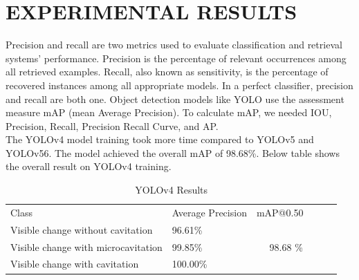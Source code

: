 \chapter{EXPERIMENTAL RESULTS}
Precision and recall are two metrics used to evaluate classification and retrieval systems' performance. Precision is the percentage of relevant occurrences among all retrieved examples. Recall, also known as sensitivity, is the percentage of recovered instances among all appropriate models. In a perfect classifier, precision and recall are both one. Object detection models like YOLO use the assessment measure mAP (mean Average Precision). To calculate mAP, we needed IOU, Precision, Recall, Precision Recall Curve, and AP.\\
The YOLOv4 model training took more time compared to YOLOv5 and YOLOv56. The model achieved the overall mAP of 98.68\%. Below table shows the overall result on YOLOv4 training. 
\begin{table}[H]
\caption{YOLOv4 Results}
\centering
\begin{tabular}{llllll} 
\cline{1-3}
\multicolumn{1}{|l|}{\textcolor[rgb]{0.141,0.125,0.129}{Class}}                               & \multicolumn{1}{l|}{\textcolor[rgb]{0.141,0.125,0.129}{Average Precision}} & \multicolumn{1}{l|}{\textcolor[rgb]{0.141,0.125,0.129}{mAP@0.50}}                                                                      &  &  &   \\ 
\cline{1-3}
\multicolumn{1}{|l|}{\textcolor[rgb]{0.141,0.125,0.129}{Visible change without cavitation}}   & \multicolumn{1}{l|}{\textcolor[rgb]{0.141,0.125,0.129}{96.61\%}}           & \multicolumn{1}{l|}{\textcolor[rgb]{0.141,0.125,0.129}{~} \textcolor[rgb]{0.141,0.125,0.129}{~} \textcolor[rgb]{0.141,0.125,0.129}{~}} &  &  &   \\ 
\cline{1-2}
\multicolumn{1}{|l|}{\textcolor[rgb]{0.141,0.125,0.129}{Visible change with microcavitation}} & \multicolumn{1}{l|}{\textcolor[rgb]{0.141,0.125,0.129}{99.85\%}}           & \multicolumn{1}{l|}{~ ~\textcolor[rgb]{0.141,0.125,0.129}{98.68 \%}}                                                                   &  &  &   \\ 
\cline{1-2}
\multicolumn{1}{|l|}{\textcolor[rgb]{0.141,0.125,0.129}{Visible change with cavitation}}      & \multicolumn{1}{l|}{\textcolor[rgb]{0.141,0.125,0.129}{100.00\%}}          & \multicolumn{1}{l|}{}                                                                                                                  &  &  &   \\ 
\cline{1-3}
 
\end{tabular}
\end{table}
